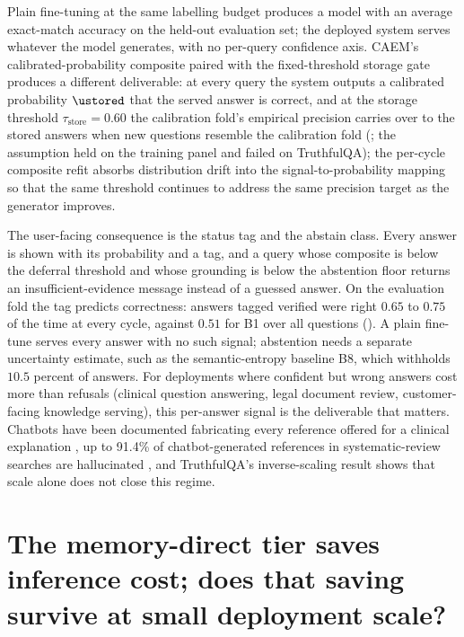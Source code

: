 Plain fine-tuning at the same labelling budget produces a model with an average exact-match accuracy on the held-out evaluation set; the deployed system serves whatever the model generates, with no per-query confidence axis. CAEM's calibrated-probability composite paired with the fixed-threshold storage gate produces a different deliverable: at every query the system outputs a calibrated probability $\ustored$ that the served answer is correct, and at the storage threshold $\tau_{\text{store}} = 0.60$ the calibration fold's empirical precision carries over to the stored answers when new questions resemble the calibration fold (; the assumption held on the training panel and failed on TruthfulQA); the per-cycle composite refit absorbs distribution drift into the signal-to-probability mapping so that the same threshold continues to address the same precision target as the generator improves.

The user-facing consequence is the status tag and the abstain class. Every answer is shown with its probability and a tag, and a query whose composite is below the deferral threshold and whose grounding is below the abstention floor returns an insufficient-evidence message instead of a guessed answer. On the evaluation fold the tag predicts correctness: answers tagged verified were right $0.65$ to $0.75$ of the time at every cycle, against $0.51$ for B1 over all questions (). A plain fine-tune serves every answer with no such signal; abstention needs a separate uncertainty estimate, such as the semantic-entropy baseline B8, which withholds $10.5$ percent of answers. For deployments where confident but wrong answers cost more than refusals (clinical question answering, legal document review, customer-facing knowledge serving), this per-answer signal is the deliverable that matters. Chatbots have been documented fabricating every reference offered for a clinical explanation \cite{alkaissi2023artificial}, up to 91.4\% of chatbot-generated references in systematic-review searches are hallucinated \cite{info:doi/10.2196/53164}, and TruthfulQA's inverse-scaling result \cite{lin-etal-2022-truthfulqa} shows that scale alone does not close this regime.


\section[Memory-direct tier at scale]{The memory-direct tier saves inference cost; does that saving survive at small deployment scale?}
\label{app:qa-memory-direct}

